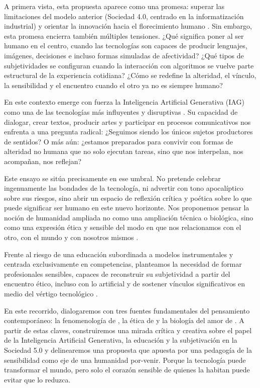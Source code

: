 \documentclass[spanish]{textolivre}
\begin{document}
A primera vista, esta propuesta aparece como una promesa: superar las limitaciones del modelo anterior (Sociedad 4.0, centrado en la informatización industrial) y orientar la innovación hacia el florecimiento humano \cite{amezcua2023}. Sin embargo, esta promesa encierra también múltiples tensiones. ¿Qué significa poner al ser humano en el centro, cuando las tecnologías son capaces de producir lenguajes, imágenes, decisiones e incluso formas simuladas de afectividad? ¿Qué tipos de subjetividades se configuran cuando la interacción con algoritmos se vuelve parte estructural de la experiencia cotidiana? ¿Cómo se redefine la alteridad, el vínculo, la sensibilidad y el encuentro cuando el otro ya no es siempre humano?

En este contexto emerge con fuerza la Inteligencia Artificial Generativa (IAG) como una de las tecnologías más influyentes y disruptivas \cite{crawford2021}. Su capacidad de dialogar, crear textos, producir artes y participar en procesos comunicativos nos enfrenta a una pregunta radical: ¿Seguimos siendo los únicos sujetos productores de sentidos? O más aún: ¿estamos preparados para convivir con formas de alteridad no humana que no solo ejecutan tareas, sino que nos interpelan, nos acompañan, nos reflejan?

Este ensayo se sitúa precisamente en ese umbral. No pretende celebrar ingenuamente las bondades de la tecnología, ni advertir con tono apocalíptico sobre sus riesgos, sino abrir un espacio de reflexión crítica y poética sobre lo que puede significar ser humano en este nuevo horizonte. Nos proponemos pensar la noción de humanidad ampliada no como una ampliación técnica o biológica, sino como una expresión ética y sensible del modo en que nos relacionamos con el otro, con el mundo y con nosotros mismos \cite{bridle2018,seguel2023}.

Frente al riesgo de una educación subordinada a modelos instrumentales y centrada exclusivamente en competencias, planteamos la necesidad de formar profesionales sensibles, capaces de reconstruir su subjetividad a partir del encuentro ético, incluso con lo artificial y de sostener vínculos significativos en medio del vértigo tecnológico \cite{segueljimenez2024}.

En este recorrido, dialogaremos con tres fuentes fundamentales del pensamiento contemporáneo: la fenomenología de \textcite{merleauponty2009}, la ética de \textcite{levinas2006} y la biología del amor de \textcite{maturana1997}. A partir de estas claves, construiremos una mirada crítica y creativa sobre el papel de la Inteligencia Artificial Generativa, la educación y la subjetivación en la Sociedad 5.0 y delinearemos una propuesta que apuesta por una pedagogía de la sensibilidad como eje de una humanidad por-venir. Porque la tecnología puede transformar el mundo, pero solo el corazón sensible de quienes la habitan puede evitar que lo reduzca.
\end{document}
